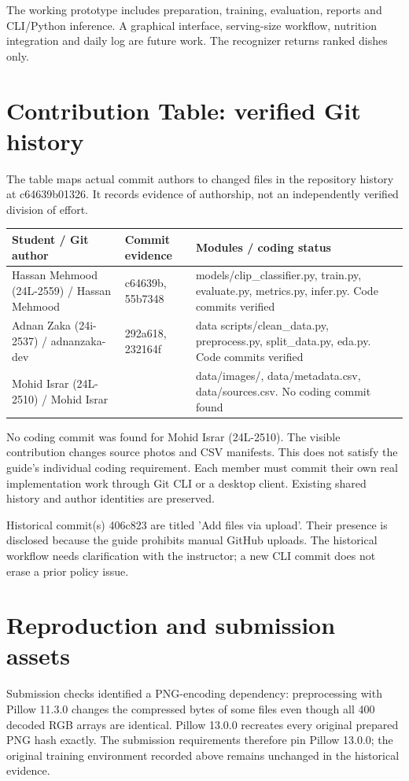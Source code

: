 \documentclass[10pt,a4paper]{article}
\begin{document}
The working prototype includes preparation, training, evaluation, reports and CLI/Python inference. A graphical interface, serving-size workflow, nutrition integration and daily log are future work. The recognizer returns ranked dishes only.

\section*{Contribution Table: verified Git history}
The table maps actual commit authors to changed files in the repository history at c64639b01326. It records evidence of authorship, not an independently verified division of effort.

\begin{center}\footnotesize\setlength{\tabcolsep}{4pt}
\begin{tabularx}{\linewidth}{>{\raggedright\arraybackslash}X>{\raggedright\arraybackslash}X>{\raggedright\arraybackslash}X}
\toprule
Student / Git author & Commit evidence & Modules / coding status \\
\midrule
Hassan Mehmood (24L-2559) / Hassan Mehmood & c64639b, 55b7348 & models/clip\_classifier.py, train.py, evaluate.py, metrics.py, infer.py. Code commits verified \\
Adnan Zaka (24i-2537) / adnanzaka-dev & 292a618, 232164f & data scripts/clean\_data.py, preprocess.py, split\_data.py, eda.py. Code commits verified \\
Mohid Israr (24L-2510) / Mohid Israr & 8210194 & data/images/, data/metadata.csv, data/sources.csv. No coding commit found \\
\bottomrule\end{tabularx}\end{center}
No coding commit was found for Mohid Israr (24L-2510). The visible contribution changes source photos and CSV manifests. This does not satisfy the guide's individual coding requirement. Each member must commit their own real implementation work through Git CLI or a desktop client. Existing shared history and author identities are preserved.

Historical commit(s) 406c823 are titled 'Add files via upload'. Their presence is disclosed because the guide prohibits manual GitHub uploads. The historical workflow needs clarification with the instructor; a new CLI commit does not erase a prior policy issue.

\section*{Reproduction and submission assets}
Submission checks identified a PNG-encoding dependency: preprocessing with Pillow 11.3.0 changes the compressed bytes of some files even though all 400 decoded RGB arrays are identical. Pillow 13.0.0 recreates every original prepared PNG hash exactly. The submission requirements therefore pin Pillow 13.0.0; the original training environment recorded above remains unchanged in the historical evidence.
\end{document}
